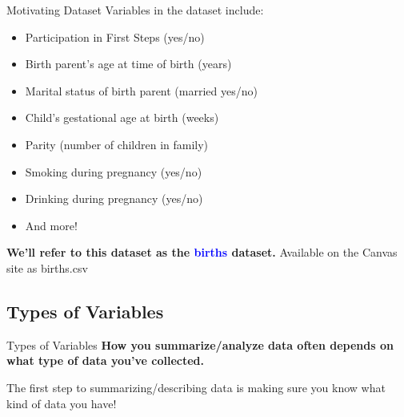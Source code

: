 \documentclass[10pt,t]{beamer}
\begin{document}
\begin{frame}{Motivating Dataset}
Variables in the dataset include:

\vspace{0.3cm}


\begin{itemize}
	\item Participation in First Steps (yes/no)
	\item Birth parent's age at time of birth (years)
	\item Marital status of birth parent (married yes/no)
	\item Child's gestational age at birth (weeks)
	\item Parity (number of children in family)
	\item Smoking during pregnancy (yes/no)
	\item Drinking during pregnancy (yes/no)
	\item And more!
\end{itemize}

\vspace{0.3cm} 

\textbf{We'll refer to this dataset as the \textcolor{blue}{births} dataset.} Available on the Canvas site as \color{blue} births.csv
\end{frame}

\subsection{Types of Variables}

\begin{frame}{Types of Variables}
\textbf{How you summarize/analyze data often depends on what type of data you've collected.}

\vspace{0.3cm}

The first step to summarizing/describing data is making sure you know what kind of data you have!

\end{frame}
\end{document}
